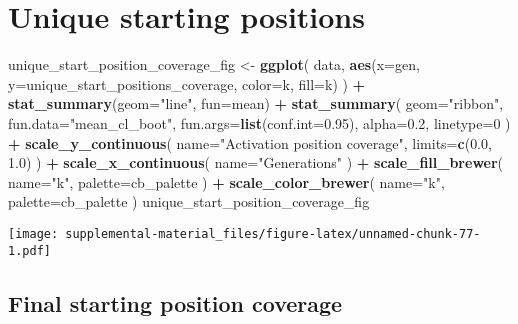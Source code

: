 \documentclass[]{book}
\newenvironment{Shaded}{\begin{snugshade}}{\end{snugshade}}
\newcommand{\DataTypeTok}[1]{\textcolor[rgb]{0.13,0.29,0.53}{#1}}
\newcommand{\DecValTok}[1]{\textcolor[rgb]{0.00,0.00,0.81}{#1}}
\newcommand{\FloatTok}[1]{\textcolor[rgb]{0.00,0.00,0.81}{#1}}
\newcommand{\KeywordTok}[1]{\textcolor[rgb]{0.13,0.29,0.53}{\textbf{#1}}}
\newcommand{\NormalTok}[1]{#1}
\newcommand{\OperatorTok}[1]{\textcolor[rgb]{0.81,0.36,0.00}{\textbf{#1}}}
\newcommand{\StringTok}[1]{\textcolor[rgb]{0.31,0.60,0.02}{#1}}
\begin{document}
\hypertarget{unique-starting-positions-7}{%
\section{Unique starting positions}\label{unique-starting-positions-7}}

\begin{Shaded}
\begin{Highlighting}[]
\NormalTok{unique_start_position_coverage_fig <-}\StringTok{ }\KeywordTok{ggplot}\NormalTok{(}
\NormalTok{    data,}
    \KeywordTok{aes}\NormalTok{(}\DataTypeTok{x=}\NormalTok{gen, }\DataTypeTok{y=}\NormalTok{unique_start_positions_coverage, }\DataTypeTok{color=}\NormalTok{k, }\DataTypeTok{fill=}\NormalTok{k)}
\NormalTok{  ) }\OperatorTok{+}
\StringTok{  }\KeywordTok{stat_summary}\NormalTok{(}\DataTypeTok{geom=}\StringTok{"line"}\NormalTok{, }\DataTypeTok{fun=}\NormalTok{mean) }\OperatorTok{+}
\StringTok{  }\KeywordTok{stat_summary}\NormalTok{(}
    \DataTypeTok{geom=}\StringTok{"ribbon"}\NormalTok{,}
    \DataTypeTok{fun.data=}\StringTok{"mean_cl_boot"}\NormalTok{,}
    \DataTypeTok{fun.args=}\KeywordTok{list}\NormalTok{(}\DataTypeTok{conf.int=}\FloatTok{0.95}\NormalTok{),}
    \DataTypeTok{alpha=}\FloatTok{0.2}\NormalTok{,}
    \DataTypeTok{linetype=}\DecValTok{0}
\NormalTok{  ) }\OperatorTok{+}
\StringTok{  }\KeywordTok{scale_y_continuous}\NormalTok{(}
    \DataTypeTok{name=}\StringTok{"Activation position coverage"}\NormalTok{,}
    \DataTypeTok{limits=}\KeywordTok{c}\NormalTok{(}\FloatTok{0.0}\NormalTok{, }\FloatTok{1.0}\NormalTok{)}
\NormalTok{  ) }\OperatorTok{+}
\StringTok{  }\KeywordTok{scale_x_continuous}\NormalTok{(}
    \DataTypeTok{name=}\StringTok{"Generations"}
\NormalTok{  ) }\OperatorTok{+}
\StringTok{  }\KeywordTok{scale_fill_brewer}\NormalTok{(}
    \DataTypeTok{name=}\StringTok{"k"}\NormalTok{,}
    \DataTypeTok{palette=}\NormalTok{cb_palette}
\NormalTok{  ) }\OperatorTok{+}
\StringTok{  }\KeywordTok{scale_color_brewer}\NormalTok{(}
    \DataTypeTok{name=}\StringTok{"k"}\NormalTok{,}
    \DataTypeTok{palette=}\NormalTok{cb_palette}
\NormalTok{  )}
\NormalTok{unique_start_position_coverage_fig}
\end{Highlighting}
\end{Shaded}

\texttt{[image: supplemental-material\_files/figure-latex/unnamed-chunk-77-1.pdf]}

\hypertarget{final-starting-position-coverage-6}{%
\subsection{Final starting position coverage}\label{final-starting-position-coverage-6}}
\end{document}
